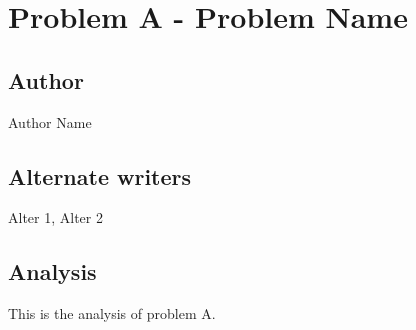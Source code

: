 \section*{Problem A - Problem Name}
\subsection*{Author}
Author Name
\subsection*{Alternate writers}
Alter 1, Alter 2

\subsection*{Analysis}
This is the analysis of problem A.